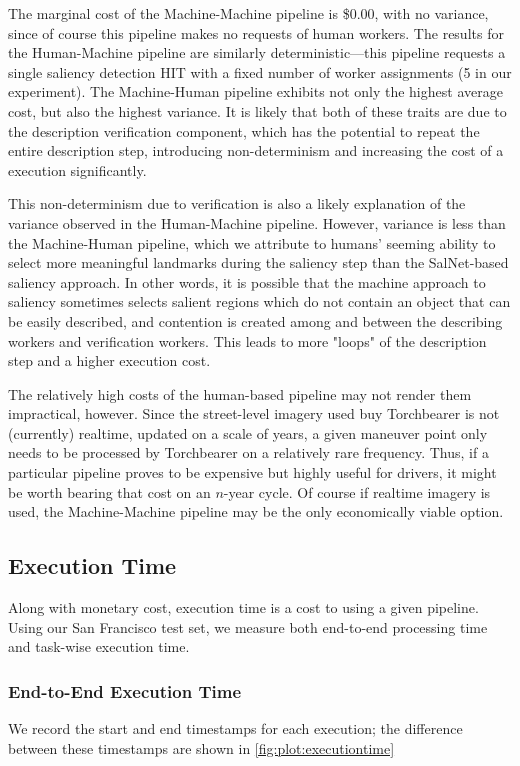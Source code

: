 The marginal cost of the Machine-Machine pipeline is \$0.00, with no variance, since of course this pipeline makes no requests of human workers. The results for the Human-Machine pipeline are similarly deterministic---this pipeline requests a single saliency detection HIT with a fixed number of worker assignments (5 in our experiment). The Machine-Human pipeline exhibits not only the highest average cost, but also the highest variance. It is likely that both of these traits are due to the description verification component, which has the potential to repeat the entire description step, introducing non-determinism and increasing the cost of a execution significantly. 

This non-determinism due to verification is also a likely explanation of the variance observed in the Human-Machine pipeline. However, variance is less than the Machine-Human pipeline, which we attribute to humans' seeming ability to select more meaningful landmarks during the saliency step than the SalNet-based saliency approach. In other words, it is possible that the machine approach to saliency sometimes selects salient regions which do not contain an object that can be easily described, and contention is created among and between the describing workers and verification workers. This leads to more "loops" of the description step and a higher execution cost.

The relatively high costs of the human-based pipeline may not render them impractical, however. Since the street-level imagery used buy Torchbearer is not (currently) realtime, updated on a scale of years, a given maneuver point only needs to be processed by Torchbearer on a relatively rare frequency. Thus, if a particular pipeline proves to be expensive but highly useful for drivers, it might be worth bearing that cost on an $n$-year cycle. Of course if realtime imagery is used, the Machine-Machine pipeline may be the only economically viable option. 

\subsection{Execution Time}
Along with monetary cost, execution time is a cost to using a given pipeline. Using our San Francisco test set, we measure both end-to-end processing time and task-wise execution time.

\subsubsection{End-to-End Execution Time}
We record the start and end timestamps for each execution; the difference between these timestamps are shown in \ref{fig:plot:executiontime}

